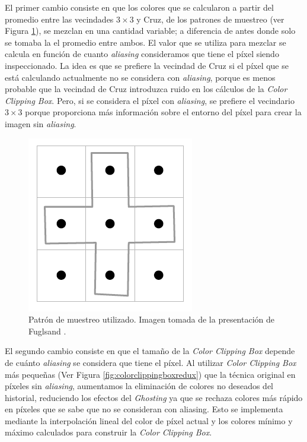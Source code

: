 \documentclass[pregrado]{tesis-usb} %
\begin{document}
El primer cambio consiste en que los colores que se calcularon a partir del promedio entre las vecindades $3\times 3$ y Cruz, de los patrones de muestreo (ver Figura \ref{fig:samplingpattern_2}), se mezclan en una cantidad variable; a diferencia de antes donde solo se tomaba la el promedio entre ambos. El valor que se utiliza para mezclar se calcula en función de cuanto \textit{aliasing} consideramos que tiene el píxel siendo inspeccionado. La idea es que se prefiere la vecindad de Cruz si el píxel que se está calculando actualmente no se considera con \textit{aliasing}, porque es menos probable que la vecindad de Cruz introduzca ruido en los cálculos de la \textit{Color Clipping Box}. Pero, si se considera el píxel con \textit{aliasing}, se prefiere el vecindario $3\times 3$ porque proporciona más información sobre el entorno del píxel para crear la imagen sin \textit{aliasing}. 

\begin{figure}[!hbt]
	\centering
	\includegraphics[scale=0.3]{images/sampling_pattern.png}
	\caption{Patrón de muestreo utilizado. Imagen tomada de la presentación de Fuglsand \protect\cite{Fuglsand2016}.}\label{fig:samplingpattern_2}
\end{figure}

El segundo cambio consiste en que el tamaño de la \textit{Color Clipping Box} depende de cuánto \textit{aliasing} se considera que tiene el píxel. Al utilizar \textit{Color Clipping Box} más pequeñas (Ver Figura \ref{fig:colorclippingboxredux}) que la técnica original en píxeles sin \textit{aliasing}, aumentamos la eliminación de colores no deseados del historial, reduciendo los efectos del \textit{Ghosting} ya que se rechaza colores más rápido en píxeles que se sabe que no se consideran con aliasing. Esto se implementa mediante la interpolación lineal del color de píxel actual y los colores mínimo y máximo calculados para construir la \textit{Color Clipping Box}.
\end{document}
